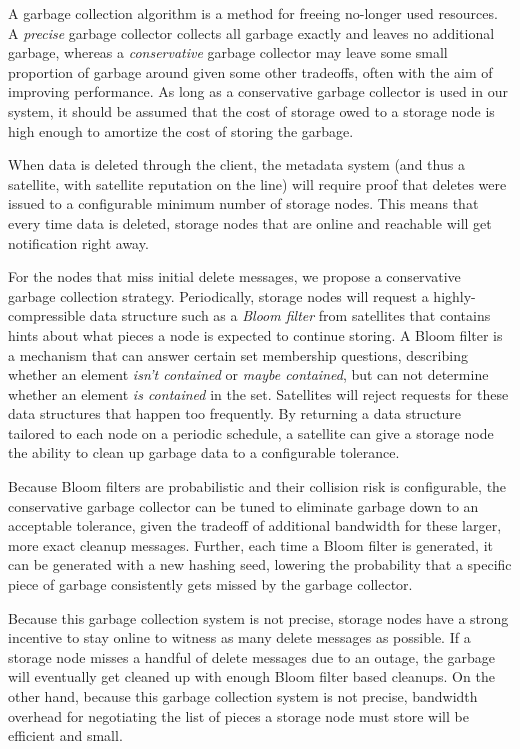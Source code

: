 \documentclass[11pt,fleqn,openany]{book}
\begin{document}
A garbage collection algorithm is a method for freeing no-longer used resources.
A {\em precise} garbage collector collects all garbage exactly and
leaves no additional garbage, whereas a {\em conservative} garbage collector may
leave some small proportion of garbage around given some other tradeoffs,
often with the aim of improving performance.
As long as a conservative garbage collector is used in our system, it should
be assumed that the cost of storage owed to a storage node is high enough
to amortize the cost of storing the garbage.

When data is deleted through the client, the metadata system (and thus a
satellite, with satellite reputation on the line) will require proof that
deletes were issued to a configurable minimum number of storage nodes.
This means that every time
data is deleted, storage nodes that are online and reachable will get
notification right away.

For the nodes that miss initial delete messages, we propose a conservative
garbage collection strategy. Periodically, storage nodes will request
a highly-compressible data structure such as a
{\em Bloom filter} \cite{bloom-filter} from satellites that contains hints about
what pieces a node is expected to continue storing.
A Bloom filter is a mechanism that can
answer certain set membership questions, describing whether an element
{\em isn't contained} or
{\em maybe contained}, but can not determine whether an element
{\em is contained} in the set.
Satellites will reject
requests for these data structures that happen too frequently.
By returning a data
structure tailored to each node on a periodic schedule, a satellite can give a
storage node the ability to clean up garbage data to a configurable tolerance.

Because Bloom filters are probabilistic and their collision risk is
configurable, the conservative garbage collector can be tuned to eliminate
garbage down to an acceptable tolerance, given the tradeoff of additional
bandwidth for these larger, more exact cleanup messages. Further, each time a
Bloom filter is generated, it can be generated with a new hashing seed, lowering
the probability that a specific piece of garbage consistently gets
missed by the garbage collector.

Because this garbage collection system is not precise, storage nodes have a
strong incentive to stay online to witness as many delete messages as possible.
If a storage node misses a handful of delete messages due to an outage, the
garbage will eventually get cleaned up with enough Bloom filter based cleanups.
On the other hand, because this garbage collection system is not precise,
bandwidth overhead for negotiating the list of pieces a storage node must store
will be efficient and small.
\end{document}
